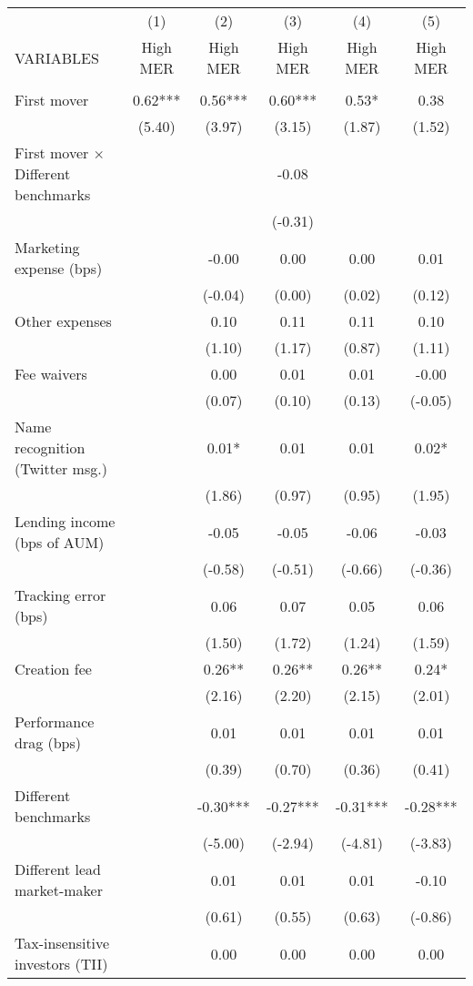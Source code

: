 \documentclass[]{article}
\begin{document}
\begin{tabular}{lccccc} \hline
 & (1) & (2) & (3) & (4) & (5) \\
VARIABLES & High MER & High MER & High MER & High MER & High MER \\ \hline
 &  &  &  &  &  \\
First mover & 0.62*** & 0.56*** & 0.60*** & 0.53* & 0.38 \\
 & (5.40) & (3.97) & (3.15) & (1.87) & (1.52) \\
First mover $\times$ Different benchmarks &  &  & -0.08 &  &  \\
 &  &  & (-0.31) &  &  \\
Marketing expense (bps) &  & -0.00 & 0.00 & 0.00 & 0.01 \\
 &  & (-0.04) & (0.00) & (0.02) & (0.12) \\
Other expenses &  & 0.10 & 0.11 & 0.11 & 0.10 \\
 &  & (1.10) & (1.17) & (0.87) & (1.11) \\
Fee waivers &  & 0.00 & 0.01 & 0.01 & -0.00 \\
 &  & (0.07) & (0.10) & (0.13) & (-0.05) \\
Name recognition (Twitter msg.) &  & 0.01* & 0.01 & 0.01 & 0.02* \\
 &  & (1.86) & (0.97) & (0.95) & (1.95) \\
Lending income (bps of AUM) &  & -0.05 & -0.05 & -0.06 & -0.03 \\
 &  & (-0.58) & (-0.51) & (-0.66) & (-0.36) \\
Tracking error (bps) &  & 0.06 & 0.07 & 0.05 & 0.06 \\
 &  & (1.50) & (1.72) & (1.24) & (1.59) \\
Creation fee &  & 0.26** & 0.26** & 0.26** & 0.24* \\
 &  & (2.16) & (2.20) & (2.15) & (2.01) \\
Performance drag (bps) &  & 0.01 & 0.01 & 0.01 & 0.01 \\
 &  & (0.39) & (0.70) & (0.36) & (0.41) \\
Different benchmarks &  & -0.30*** & -0.27*** & -0.31*** & -0.28*** \\
 &  & (-5.00) & (-2.94) & (-4.81) & (-3.83) \\
Different lead market-maker &  & 0.01 & 0.01 & 0.01 & -0.10 \\
 &  & (0.61) & (0.55) & (0.63) & (-0.86) \\
Tax-insensitive investors (TII) &  & 0.00 & 0.00 & 0.00 & 0.00 \\

\end{tabular}
\end{document}
